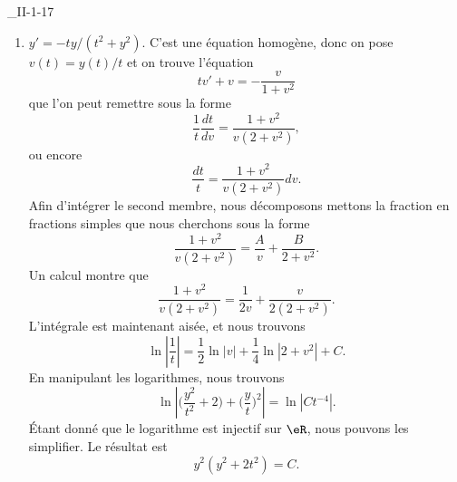 \begin{corrige}{_II-1-17}
\begin{enumerate}
		\item
		      $y'=-ty/(t^2+y^2)$. C'est une équation homogène, donc on pose $v(t)=y(t)/t$ et on trouve l'équation
		      \begin{equation}
			      tv'+v=-\frac{ v }{ 1+v^2 }
		      \end{equation}
		      que l'on peut remettre sous la forme
		      \begin{equation}
			      \frac{1}{ t }\frac{ dt }{ dv }=\frac{ 1+v^2 }{ v(2+v^2) },
		      \end{equation}
		      ou encore
		      \begin{equation}
			      \frac{ dt }{ t }=\frac{ 1+v^2 }{ v(2+v^2) }dv.
		      \end{equation}
		      Afin d'intégrer le second membre, nous décomposons mettons la fraction en fractions simples que nous cherchons sous la forme
		      \begin{equation}
			      \frac{ 1+v^2 }{ v(2+v^2) }=\frac{ A }{ v }+\frac{ B }{ 2+v^2 }.
		      \end{equation}
		      Un calcul montre que
		      \begin{equation}
			      \frac{ 1+v^2 }{ v(2+v^2) }=\frac{ 1 }{ 2v }+\frac{ v }{ 2(2+v^2) }.
		      \end{equation}
		      L'intégrale est maintenant aisée, et nous trouvons
		      \begin{equation}
			      \ln\left| \frac{ 1 }{ t } \right| =\frac{ 1 }{2}\ln| v |+\frac{1}{ 4 }\ln| 2+v^2 |+C.
		      \end{equation}
		      En manipulant les logarithmes, nous trouvons
		      \begin{equation}
			      \ln\left| \big( \frac{ y^2 }{ t^2 }+2\big)+\big( \frac{ y }{ t } \big)^2  \right|=\ln| Ct^{-4} |.
		      \end{equation}
		      Étant donné que le logarithme est injectif sur $\eR$, nous pouvons les simplifier. Le résultat est
		      \begin{equation}
			      y^2(y^2+2t^2)=C.
		      \end{equation}

	\end{enumerate}

\end{corrige}
